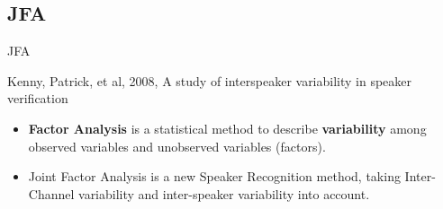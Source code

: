 
\subsection{JFA}

\begin{frame}{JFA}
  \begin{reference}{4mm}{85mm}
    Kenny, Patrick, et al, 2008,
    A study of interspeaker variability in speaker verification
  \end{reference}

  \begin{itemize}
    \item \textbf{Factor Analysis} is a statistical method to describe \textbf{variability}
      among observed variables and unobserved variables (factors).

    \item Joint Factor Analysis is a new Speaker Recognition method, taking
      Inter-Channel variability and inter-speaker variability into account.
  \end{itemize}
\end{frame}
